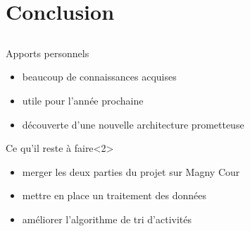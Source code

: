 \documentclass[mathserif]{beamer}
\newcommand{\bframe}{\begin{frame}{\secname}{\subsecname}}
\begin{document}
  \section{Conclusion}
    \subsection{}
      \bframe
        \begin{block}{Apports personnels}
          \begin{itemize}
            \item beaucoup de connaissances acquises
            \item utile pour l'année prochaine
            \item découverte d'une nouvelle architecture prometteuse
          \end{itemize}
        \end{block}
        \begin{block}{Ce qu'il reste à faire}<2>
          \begin{itemize}
            \item merger les deux parties du projet sur Magny Cour
            \item mettre en place un traitement des données
            \item améliorer l'algorithme de tri d'activités
          \end{itemize}
        \end{block}
      \end{frame}

\end{document}
